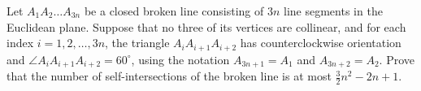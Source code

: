 \documentclass{article}
\begin{document}
\setlength{\parindent}{0pt}
Let $A_1A_2 \ldots A_{3n}$ be a closed broken line consisting of $3n$ line segments in the Euclidean plane. Suppose that no three of its vertices are collinear, and for each index ${i = 1, 2, \ldots, 3n}$, the triangle $A_iA_{i+1}A_{i+2}$ has counterclockwise orientation and ${\angle A_iA_{i+1}A_{i+2} = 60^\circ}$, using the notation $A_{3n+1} = A_1$ and $A_{3n+2} = A_2$. Prove that the number of self-intersections of the broken line is at most $\frac{3}{2}n^2 - 2n + 1$.
\end{document}
